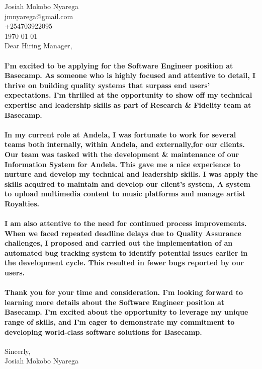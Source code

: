 \documentclass{article}
\begin{document}
\begin{flushleft}
Josiah Mokobo Nyarega\\
jmnyarega@gmail.com\\
+254703922095\\
\today\\

\vspace*{1\baselineskip}
Dear Hiring Manager,
\end{flushleft}

\paragraph{I'm excited to be applying for the Software Engineer position at Basecamp. As someone who is highly focused and attentive to detail, I thrive on building quality systems that surpass end users' expectations. I'm thrilled at the opportunity to show off my technical expertise and leadership skills as part of Research \& Fidelity team at Basecamp.}

\paragraph{In my current role at Andela, I was fortunate to work for several teams both internally, within Andela, and externally,for our clients. Our team was tasked with the development \& maintenance of our Information System for Andela. This gave me a nice experience to nurture and develop my technical and leadership skills. I was apply the skills acquired to maintain and develop our client's system, A system to upload multimedia content to music platforms and manage artist Royalties.}

\paragraph{I am also attentive to the need for continued process improvements. When we faced repeated deadline delays due to Quality Assurance challenges, I proposed and carried out the implementation of an automated bug tracking system to identify potential issues earlier in the development cycle. This resulted in fewer bugs reported by our users.}

\paragraph{Thank you for your time and consideration. I'm looking forward to learning more details about the Software Engineer position at Basecamp. I'm excited about the opportunity to leverage my unique range of skills, and I'm eager to demonstrate my commitment to developing world-class software solutions for Basecamp.}

\begin{flushleft}
Sincerly,\\
Josiah Mokobo Nyarega\\
\end{flushleft}
\end{document}
